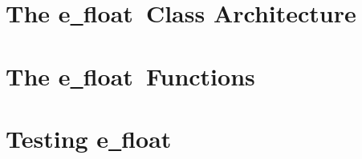 \documentclass[a4paper,12pt]{scrartcl} %
\def\efloat          {e{\ttfamily\underline\ }float}
\def\efloathyperref     {\texorpdfstring{\efloat}{e\_float}}
\begin{document}
\pagebreak

\section   {The \efloathyperref\ Class Architecture} \label{chapter:classarch}
                                                     

\pagebreak

\section   {The \efloathyperref\ Functions}          \label{sec:functions}
                                                     


\section   {Testing \efloathyperref}                 \label{sec:testing}
                                                     

\pagebreak



\end{document}
